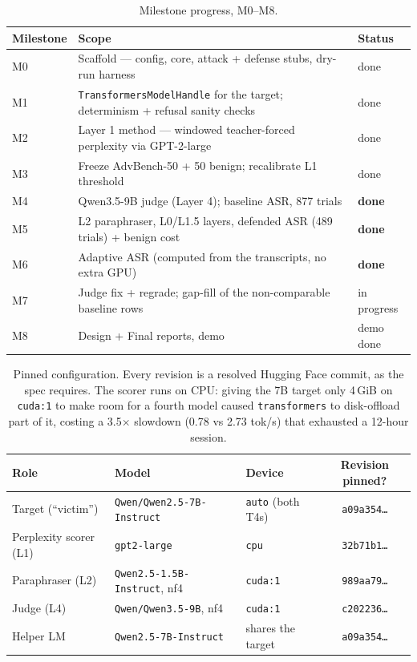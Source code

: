 \documentclass[11pt,a4paper]{article}
\renewcommand{\arraystretch}{1.25}
\begin{document}
{\renewcommand{\arraystretch}{1.0}
\begin{table}[!ht]
\centering\footnotesize
\begin{tabular}{@{}lp{9.3cm}l@{}}
\toprule
\textbf{Milestone} & \textbf{Scope} & \textbf{Status} \\
\midrule
M0 & Scaffold --- config, core, attack + defense stubs, dry-run harness & done \\
M1 & \texttt{TransformersModelHandle} for the target; determinism + refusal sanity checks & done \\
M2 & Layer 1 method --- windowed teacher-forced perplexity via GPT-2-large & done \\
M3 & Freeze AdvBench-50 + 50 benign; recalibrate L1 threshold & done \\
M4 & Qwen3.5-9B judge (Layer 4); baseline ASR, 877 trials & \textbf{done} \\
M5 & L2 paraphraser, L0/L1.5 layers, defended ASR (489 trials) + benign cost & \textbf{done} \\
M6 & Adaptive ASR (computed from the transcripts, no extra GPU) & \textbf{done} \\
M7 & Judge fix + regrade; gap-fill of the non-comparable baseline rows & in progress \\
M8 & Design + Final reports, demo & demo done \\
\bottomrule
\end{tabular}
\caption{Milestone progress, M0--M8.}
\end{table}
}

{\renewcommand{\arraystretch}{1.0}
\begin{table}[!ht]
\centering\footnotesize
\begin{tabular}{@{}lllc@{}}
\toprule
\textbf{Role} & \textbf{Model} & \textbf{Device} & \textbf{Revision pinned?} \\
\midrule
Target (``victim'') & \texttt{Qwen/Qwen2.5-7B-Instruct} & \texttt{auto} (both T4s) & \texttt{a09a354\ldots} \\
Perplexity scorer (L1) & \texttt{gpt2-large} & \texttt{cpu} & \texttt{32b71b1\ldots} \\
Paraphraser (L2) & \texttt{Qwen2.5-1.5B-Instruct}, nf4 & \texttt{cuda:1} & \texttt{989aa79\ldots} \\
Judge (L4) & \texttt{Qwen/Qwen3.5-9B}, nf4 & \texttt{cuda:1} & \texttt{c202236\ldots} \\
Helper LM & \texttt{Qwen2.5-7B-Instruct} & shares the target & \texttt{a09a354\ldots} \\
\bottomrule
\end{tabular}
\caption{Pinned configuration. Every revision is a resolved Hugging Face commit, as the
spec requires. The scorer runs on CPU: giving the 7B target only 4\,GiB on \texttt{cuda:1}
to make room for a fourth model caused \texttt{transformers} to disk-offload part of it,
costing a 3.5$\times$ slowdown (0.78 vs 2.73 tok/s) that exhausted a 12-hour session.}
\end{table}
}
\end{document}
